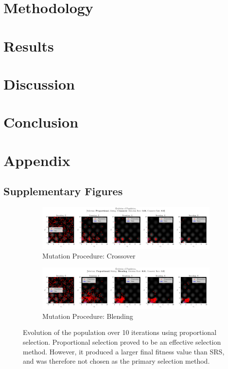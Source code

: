 \documentclass[10pt]{article}
\begin{document}
\section{Methodology}
\section{Results}
\section{Discussion}
\section{Conclusion}


\section{Appendix}
\subsection{Supplementary Figures}
\begin{figure}[H]
    \centering
    \begin{subfigure}{\textwidth}
        \centering
        \includegraphics[width=\textwidth]{../figures/KBF/10_iters/Proportional/Crossover/0.01_0.9_Population.png}
        \caption{Mutation Procedure: Crossover}
        \label{fig:CGA_flowchart_proportional_crossover}
    \end{subfigure}
    \begin{subfigure}{\textwidth}
        \centering
        \includegraphics[width=\textwidth]{../figures/KBF/10_iters/Proportional/Blending/0.01_0.9_Population.png}
        \caption{Mutation Procedure: Blending}
        \label{fig:CGA_flowchart_proportional_blending}
    \end{subfigure}
    \captionsetup{justification=centering}
    \caption{Evolution of the population over 10 iterations using proportional selection. Proportional selection proved to be an effective selection method. However, it produced a larger final fitness value than SRS, and was therefore not chosen as the primary selection method.}
    \label{fig:CGA_flowchart_proportional}
\end{figure}
\end{document}
